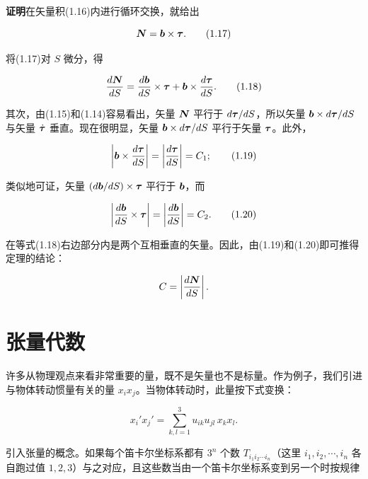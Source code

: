 \textbf{证明}\quad 在矢量积(1.16)内进行循环交换，就给出

\begin{equation}
\bm{N} = \bm{b} \times \bm{\tau}.
\tag{1.17}
\end{equation}

将(1.17)对 $S$ 微分，得

\begin{equation}
\frac{d\bm{N}}{dS} = \frac{d\bm{b}}{dS} \times \bm{\tau} + \bm{b} \times \frac{d\bm{\tau}}{dS}.
\tag{1.18}
\end{equation}

其次，由(1.15)和(1.14)容易看出，矢量 $\bm{N}$ 平行于 $d\bm{\tau}/dS$，所以矢量 $\bm{b} \times d\bm{\tau}/dS$ 与矢量 $\dot{\bm{\tau}}$ 垂直。现在很明显，矢量 $\bm{b} \times d\bm{\tau}/dS$ 平行于矢量 $\bm{\tau}$。此外，

\begin{equation}
\left|\bm{b} \times \frac{d\bm{\tau}}{dS}\right| = \left|\frac{d\bm{\tau}}{dS}\right| = C_1;
\tag{1.19}
\end{equation}

类似地可证，矢量 $(d\bm{b}/dS) \times \bm{\tau}$ 平行于 $\bm{b}$，而

\begin{equation}
\left|\frac{d\bm{b}}{dS} \times \bm{\tau}\right| = \left|\frac{d\bm{b}}{dS}\right| = C_2.
\tag{1.20}
\end{equation}

在等式(1.18)右边部分内是两个互相垂直的矢量。因此，由(1.19)和(1.20)即可推得定理的结论：

\begin{equation*}
C = \left|\frac{d\bm{N}}{dS}\right|.
\end{equation*}

\section{张量代数}

许多从物理观点来看非常重要的量，既不是矢量也不是标量。作为例子，我们引进与物体转动惯量有关的量 $x_i x_j$。当物体转动时，此量按下式变换：

\begin{equation*}
x_i' x_j' = \sum_{k,l=1}^{3} u_{ik} u_{jl}\, x_k x_l.
\end{equation*}

引入张量的概念。如果每个笛卡尔坐标系都有 $3^{n}$ 个数 $T_{i_1 i_2 \cdots i_n}$（这里 $i_1, i_2, \cdots, i_n$ 各自跑过值 $1, 2, 3$）与之对应，且这些数当由一个笛卡尔坐标系变到另一个时按规律

